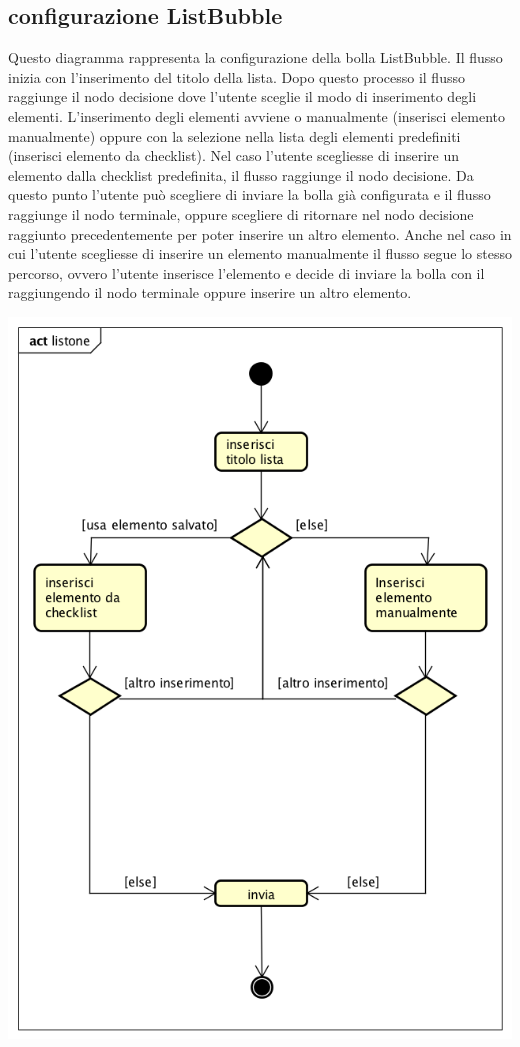 \subsection{configurazione ListBubble}
Questo diagramma rappresenta la configurazione della bolla ListBubble. Il flusso inizia con l’inserimento del titolo della lista. Dopo questo processo il flusso raggiunge il nodo decisione dove l’utente sceglie il modo di inserimento degli elementi. L’inserimento degli elementi avviene o manualmente (inserisci elemento manualmente) oppure con la selezione nella lista degli elementi predefiniti (inserisci elemento da checklist). Nel caso l’utente scegliesse di inserire un elemento dalla checklist predefinita, il flusso raggiunge il nodo decisione. Da questo punto l’utente può scegliere di inviare la bolla già configurata e il flusso raggiunge il nodo terminale, oppure scegliere di ritornare nel nodo decisione raggiunto precedentemente per poter inserire un altro elemento. Anche nel caso in cui l’utente scegliesse di inserire un elemento manualmente il flusso segue lo stesso percorso, ovvero l’utente inserisce l’elemento e decide di inviare la bolla con il raggiungendo il nodo terminale oppure inserire un altro elemento.

\begin{center}
  \includegraphics[scale=0.5]{img/ListBubble.png}
\end{center}



